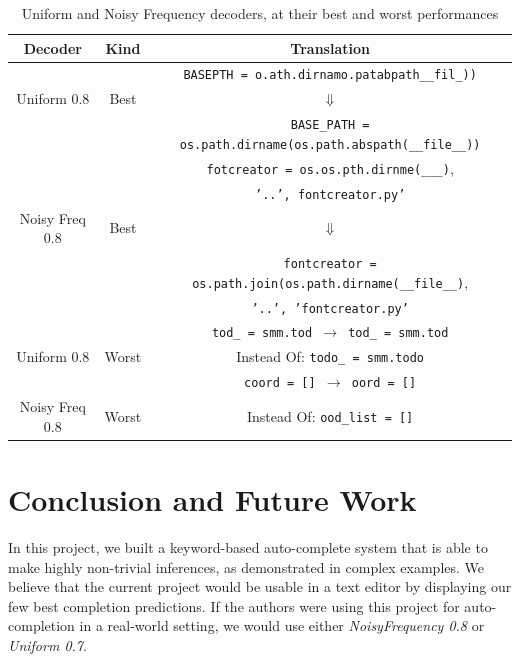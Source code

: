 \documentclass{article}
\begin{document}
\begin{table}[h!]
    \centering
    \begin{tabular}{c|c|c}
         \textbf{Decoder} & \textbf{Kind} & \textbf{Translation} \\ \hline
         & & \texttt{BASEPTH = o.ath.dirnamo.patabpath\_\_fil\_))} \\
         Uniform 0.8 & Best & $\Downarrow$ \\
         & & \texttt{BASE\_PATH = os.path.dirname(os.path.abspath(\_\_file\_\_))} \\
         \hline

         & & \texttt{fotcreator = os.os.pth.dirnme(\_\_\_)}, \\
         & & \texttt{'..', fontcreator.py'} \\
         Noisy Freq 0.8 & Best & $\Downarrow$ \\
         & & \texttt{fontcreator = os.path.join(os.path.dirname(\_\_file\_\_)}, \\
         & & \texttt{'..', 'fontcreator.py'} \\ \hline

         & & \texttt{tod\_ = smm.tod $\rightarrow$ tod\_ = smm.tod} \\
         Uniform 0.8 & Worst & Instead Of: \texttt{todo\_ = smm.todo} \\
         \hline

         & & \texttt{coord = [] $\rightarrow$ oord = []} \\
         Noisy Freq 0.8 & Worst & Instead Of: \texttt{ood\_list = []} \\
         \hline

    \end{tabular}
    \bigskip
    \caption{Uniform and Noisy Frequency decoders, at their best and worst performances}
    \label{tab:best_and_worst}
\end{table}{}

\section{Conclusion and Future Work}

In this project, we built a keyword-based auto-complete system that is able to make highly non-trivial inferences, as
demonstrated in complex examples.
We believe that the current project would be usable in a text editor by displaying our few best completion predictions.
If the authors were using this project for auto-completion in a real-world setting,
we would use either \emph{NoisyFrequency 0.8} or
\emph{Uniform 0.7}.
\end{document}

